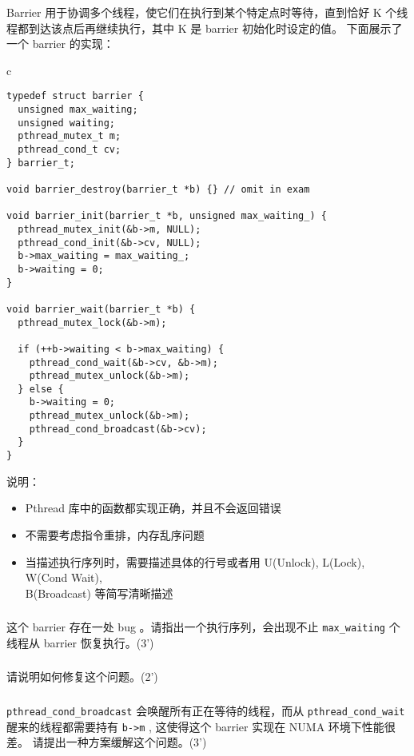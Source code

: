 \documentclass[a4paper,12pt]{article}
\newcommand{\score}[1]{(#1')}
\begin{document}
Barrier 用于协调多个线程，使它们在执行到某个特定点时等待，直到恰好 K 个线程都到达该点后再继续执行，其中 K 是 barrier 初始化时设定的值。
下面展示了一个 barrier 的实现：

\begin{table}[htb]
  \centering
  \begin{tabular}{c}
    \begin{lstlisting}
typedef struct barrier {
  unsigned max_waiting;
  unsigned waiting;
  pthread_mutex_t m;
  pthread_cond_t cv;
} barrier_t;

void barrier_destroy(barrier_t *b) {} // omit in exam

void barrier_init(barrier_t *b, unsigned max_waiting_) {
  pthread_mutex_init(&b->m, NULL);
  pthread_cond_init(&b->cv, NULL);
  b->max_waiting = max_waiting_;
  b->waiting = 0;
}

void barrier_wait(barrier_t *b) {
  pthread_mutex_lock(&b->m);

  if (++b->waiting < b->max_waiting) {
    pthread_cond_wait(&b->cv, &b->m);
    pthread_mutex_unlock(&b->m);
  } else {
    b->waiting = 0;
    pthread_mutex_unlock(&b->m);
    pthread_cond_broadcast(&b->cv);
  }
}
    \end{lstlisting}
  \end{tabular}
\end{table}



说明：

\begin{itemize}
  \item Pthread 库中的函数都实现正确，并且不会返回错误
  \item 不需要考虑指令重排，内存乱序问题
  \item 当描述执行序列时，需要描述具体的行号或者用 U(Unlock), L(Lock), W(Cond Wait), \\
        B(Broadcast) 等简写清晰描述
\end{itemize}


\subsubsection{}

这个 barrier 存在一处 bug 。请指出一个执行序列，会出现不止 \verb|max_waiting| 个线程从 barrier 恢复执行。\score{3}

\subsubsection{}

请说明如何修复这个问题。\score{2}

\subsubsection{}

\verb|pthread_cond_broadcast| 会唤醒所有正在等待的线程，而从 \verb|pthread_cond_wait| 醒来的线程都需要持有 \verb|b->m| , 这使得这个 barrier 实现在 NUMA 环境下性能很差。
请提出一种方案缓解这个问题。\score{3}


\label{LastPage}
\end{document}
